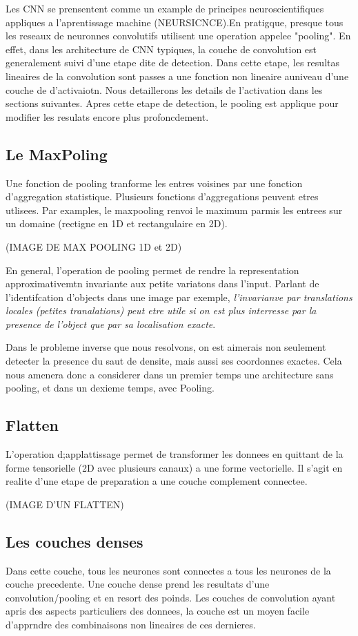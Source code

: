 Les CNN se prensentent comme un example de principes neuroscientifiques appliques a l'aprentissage machine (NEURSICNCE).En pratigque, presque tous les reseaux de neuronnes convolutifs utilisent une operation appelee "pooling". En effet, dans les architecture de CNN typiques, la couche de convolution est generalement suivi d'une etape dite de detection. Dans cette etape, les resultas lineaires de la convolution sont passes a une fonction non lineaire auniveau d'une couche de d'activaiotn. Nous detaillerons les details de l'activation dans les sections suivantes. Apres cette etape de detection, le pooling est applique pour modifier les resulats encore plus profoncdement.

\subsection{Le MaxPoling}
Une fonction de pooling tranforme les entres voisines par une fonction d'aggregation statistique. Plusieurs fonctions d'aggregations peuvent etres utlisees. Par examples, le maxpooling renvoi le maximum parmis les entrees sur un domaine (rectigne en 1D et rectangulaire en 2D). 

(IMAGE DE MAX POOLING 1D et 2D)

En general, l'operation de pooling permet de rendre la representation approximativemtn invariante aux petite variatons dans l'input. Parlant de l'identifcation d'objects dans une image par exemple, \textit{l'invarianve par translations locales (petites tranalations) peut etre utile si on est plus interresse par la presence de l'object que par sa localisation exacte}\parencite[321ff.]{Reference5}.

Dans le probleme inverse que nous resolvons, on est aimerais non seulement detecter la presence du saut de densite, mais aussi ses coordonnes exactes. Cela nous amenera donc a considerer dans un premier temps une architecture sans pooling, et dans un dexieme temps, avec Pooling.
 
\subsection{Flatten}
L'operation d;applattissage permet de transformer les donnees en quittant de la forme tensorielle (2D avec plusieurs canaux) a une forme vectorielle. Il s'agit en realite d'une etape de preparation a une couche complement connectee.

(IMAGE D'UN FLATTEN)

\subsection{Les couches denses}
Dans cette couche, tous les neurones sont connectes a tous les neurones de la couche precedente. Une couche dense prend les resultats d'une convolution/pooling et en resort des poinds. Les couches de convolution ayant apris des aspects particuliers des donnees, la couche est un moyen facile d'apprndre des combinaisons non lineaires de ces dernieres.

